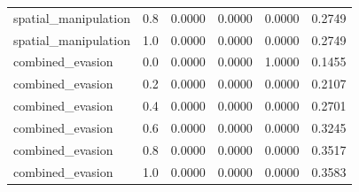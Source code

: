 \begin{table}[htbp]
\begin{tabular}{lrrrrr}
spatial\_manipulation & 0.8 & 0.0000 & 0.0000 & 0.0000 & 0.2749 \\
spatial\_manipulation & 1.0 & 0.0000 & 0.0000 & 0.0000 & 0.2749 \\
combined\_evasion & 0.0 & 0.0000 & 0.0000 & 1.0000 & 0.1455 \\
combined\_evasion & 0.2 & 0.0000 & 0.0000 & 0.0000 & 0.2107 \\
combined\_evasion & 0.4 & 0.0000 & 0.0000 & 0.0000 & 0.2701 \\
combined\_evasion & 0.6 & 0.0000 & 0.0000 & 0.0000 & 0.3245 \\
combined\_evasion & 0.8 & 0.0000 & 0.0000 & 0.0000 & 0.3517 \\
combined\_evasion & 1.0 & 0.0000 & 0.0000 & 0.0000 & 0.3583 \\
\bottomrule
\end{tabular}
\end{table}
